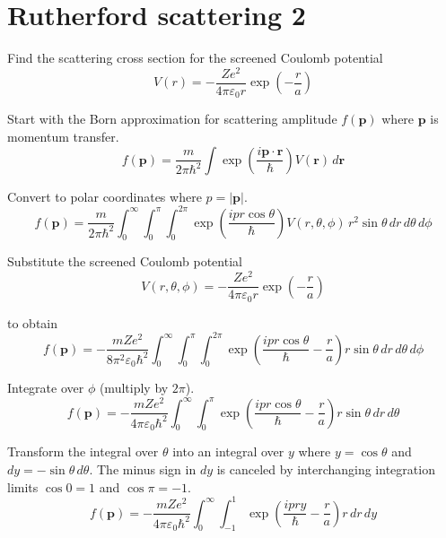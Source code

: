

\section*{Rutherford scattering 2}

Find the scattering cross section for the screened Coulomb potential
\begin{equation*}
V(r)=-\frac{Ze^2}{4\pi\varepsilon_0r}\exp\left(-\frac{r}{a}\right)
\end{equation*}

Start with the Born approximation for scattering amplitude $f(\mathbf p)$ where $\mathbf p$
is momentum transfer.
\begin{equation*}
f(\mathbf p)
=\frac{m}{2\pi\hbar^2}
\int\exp\left(\frac{i\mathbf p\cdot\mathbf r}{\hbar}\right)V(\mathbf r)\,d\mathbf r
\end{equation*}

Convert to polar coordinates where $p=|\mathbf p|$.
\begin{equation*}
f(\mathbf p)
=\frac{m}{2\pi\hbar^2}
\int_0^\infty
\int_0^\pi
\int_0^{2\pi}
\exp\left(\frac{ipr\cos\theta}{\hbar}\right)V(r,\theta,\phi)
\,r^2\sin\theta\,dr\,d\theta\,d\phi
\end{equation*}

Substitute the screened Coulomb potential
\begin{equation*}
V(r,\theta,\phi)=-\frac{Ze^2}{4\pi\varepsilon_0r}\exp\left(-\frac{r}{a}\right)
\end{equation*}

to obtain
\begin{equation*}
f(\mathbf p)
=-\frac{mZe^2}{8\pi^2\varepsilon_0\hbar^2}
\int_0^\infty
\int_0^\pi
\int_0^{2\pi}
\exp\left(\frac{ipr\cos\theta}{\hbar}-\frac{r}{a}\right)
r\sin\theta\,dr\,d\theta\,d\phi
\end{equation*}

Integrate over $\phi$ (multiply by $2\pi$).
\begin{equation*}
f(\mathbf p)
=-\frac{mZe^2}{4\pi\varepsilon_0\hbar^2}
\int_0^\infty
\int_0^\pi
\exp\left(\frac{ipr\cos\theta}{\hbar}-\frac{r}{a}\right)
r\sin\theta\,dr\,d\theta
\end{equation*}

Transform the integral over $\theta$ into an integral over $y$
where $y=\cos\theta$ and $dy=-\sin\theta\,d\theta$.
The minus sign in $dy$ is canceled by interchanging integration limits
$\cos0=1$ and $\cos\pi=-1$.
\begin{equation*}
f(\mathbf p)
=-\frac{mZe^2}{4\pi\varepsilon_0\hbar^2}
\int_0^\infty
\int_{-1}^1
\exp\left(\frac{ipry}{\hbar}-\frac{r}{a}\right)
r\,dr\,dy
\end{equation*}

